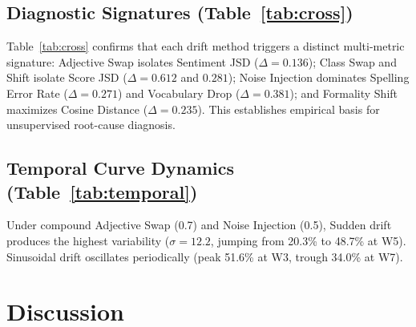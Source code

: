 \documentclass[conference]{IEEEtran}
\begin{document}
\subsection{Diagnostic Signatures (Table~\ref{tab:cross})}
Table~\ref{tab:cross} confirms that each drift method triggers a distinct multi-metric signature: Adjective Swap isolates Sentiment JSD ($\Delta=0.136$); Class Swap and Shift isolate Score JSD ($\Delta=0.612$ and $0.281$); Noise Injection dominates Spelling Error Rate ($\Delta=0.271$) and Vocabulary Drop ($\Delta=0.381$); and Formality Shift maximizes Cosine Distance ($\Delta=0.235$). This establishes empirical basis for unsupervised root-cause diagnosis.

\begin{table}[htbp]
\caption{Composite Drift Magnitude (\%) Across Temporal Curves}
\label{tab:temporal}
\centering
\setlength{\tabcolsep}{2.2pt}
\end{table}

\subsection{Temporal Curve Dynamics (Table~\ref{tab:temporal})}
Under compound Adjective Swap (0.7) and Noise Injection (0.5), Sudden drift produces the highest variability ($\sigma = 12.2$, jumping from 20.3\% to 48.7\% at W5). Sinusoidal drift oscillates periodically (peak 51.6\% at W3, trough 34.0\% at W7).

\section{Discussion}
\end{document}
